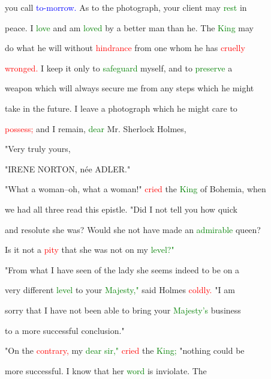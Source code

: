  you call \textcolor{blue}{to-morrow.} As to the photograph, your client may \textcolor{green}{rest} in

 \textcolor{BurntOrange}{peace.} I \textcolor{green}{love} and am \textcolor{green}{loved} by a better man than he. The \textcolor{green}{King} may

 do what he will without \textcolor{red}{hindrance} from one whom he has \textcolor{red}{cruelly}

 \textcolor{red}{wronged.} I keep it only to \textcolor{green}{safeguard} myself, and to \textcolor{green}{preserve} a

 weapon which will always secure me from any steps which he might

 take in the future. I \textcolor{BurntOrange}{leave} a photograph which he might care to

 \textcolor{red}{possess;} and I remain, \textcolor{green}{dear} Mr. Sherlock Holmes,



 "Very truly yours,

 "IRENE NORTON, née ADLER."



 "What a woman--oh, what a woman!" \textcolor{red}{cried} the \textcolor{green}{King} of Bohemia, when

 we had all three read this epistle. "Did I not tell you how quick

 and resolute she was? Would she not have made an \textcolor{green}{admirable} queen?

 Is it not a \textcolor{red}{pity} that she was not on my \textcolor{green}{level?"}



 "From what I have seen of the lady she seems indeed to be on a

 very different \textcolor{green}{level} to your \textcolor{green}{Majesty,"} said Holmes \textcolor{red}{coldly.} "I am

 sorry that I have not been able to bring your \textcolor{green}{Majesty's} business

 to a more \textcolor{BurntOrange}{successful} conclusion."



 "On the \textcolor{red}{contrary,} my \textcolor{green}{dear} \textcolor{green}{sir,"} \textcolor{red}{cried} the \textcolor{green}{King;} "nothing could be

 more \textcolor{BurntOrange}{successful.} I know that her \textcolor{green}{word} is inviolate. The

